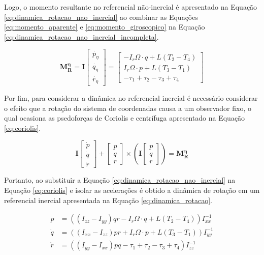 \documentclass[main.tex]{subfiles}
\begin{document}
 Logo, o momento resultante no referencial não-inercial é apresentado na Equação \ref{eq:dinamica_rotacao_nao_inercial} ao combinar as Equações \ref{eq:momento_aparente} e \ref{eq:momento_giroscopico} na Equação \ref{eq:dinamica_rotacao_nao_inercial_incompleta}.

\begin{equation}\label{eq:dinamica_rotacao_nao_inercial}
	\boldsymbol{M^\eta_R} = \boldsymbol{I} \begin{bmatrix}
		\dot{p_\eta}\\
		\dot{q_\eta}\\
		\dot{r_\eta}
	\end{bmatrix} = \begin{bmatrix}
	- I_r\Omega\cdot q + L(T_2 - T_4)\\
	I_r\Omega\cdot p + L(T_3 - T_1)\\
	-\tau_1 + \tau_2 - \tau_3 + \tau_4
	\end{bmatrix}
\end{equation}

Por fim, para considerar a dinâmica no referencial inercial é necessário considerar o efeito que a rotação do sistema de coordenadas causa a um observador fixo, o qual ocasiona as psedoforças de Coriolis e centrífuga \cite{classica:livro} apresentado na Equação \ref{eq:coriolis}.

\begin{equation}\label{eq:coriolis}
	\boldsymbol{I}\begin{bmatrix}
		\dot{p}\\
		\dot{q}\\
		\dot{r}
	\end{bmatrix} + \begin{bmatrix}
		p\\
		q\\
		r
	\end{bmatrix}\times\left(\boldsymbol{I}\begin{bmatrix}
	p\\
	q\\
	r
	\end{bmatrix}\right) = \boldsymbol{M^\eta_R}
\end{equation}

Portanto, ao substituir a Equação \ref{eq:dinamica_rotacao_nao_inercial} na Equação \ref{eq:coriolis} e isolar as acelerações é obtido a dinâmica de rotação em um referencial inercial apresentada na Equação \ref{eq:dinamica_rotacao}.

\begin{equation}\label{eq:dinamica_rotacao}
	\begin{split}
		\dot{p} &= \left((I_{zz} - I_{yy})qr - I_r\Omega\cdot q + L(T_2 - T_4)\right)I_{xx}^{-1}\\
		\dot{q} &= \left((I_{xx} - I_{zz})pr + I_r\Omega\cdot p + L(T_3 - T_1)\right)I_{yy}^{-1}\\
		\dot{r} &= \left((I_{yy} - I_{xx})pq -\tau_1 + \tau_2 - \tau_3 + \tau_4\right)I_{zz}^{-1}\\
	\end{split}
\end{equation}
\end{document}
